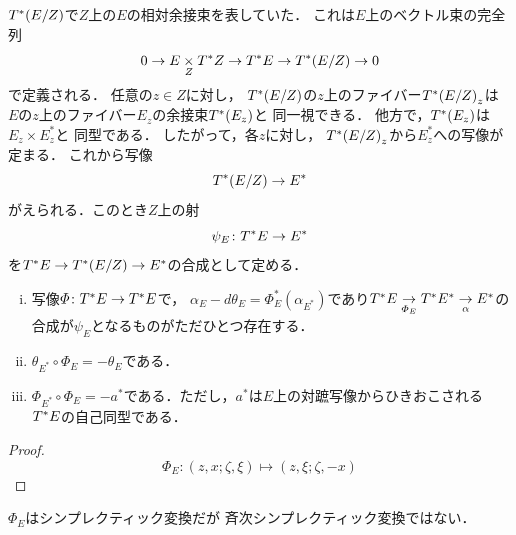 \(\cotb[(E/Z)]\)で\(Z\)上の\(E\)の相対余接束を表していた．
これは\(E\)上のベクトル束の完全列
\begin{equation}
    0\to E\pb[Z]\cotb[Z]\to\cotb[E]\to\cotb[(E/Z)]\to0
\end{equation}
で定義される．
任意の\(z\in Z\)に対し，
\(\cotb[(E/Z)]\)の\(z\)上のファイバー\(\cotb[(E/Z)]_{z}\)は
\(E\)の\(z\)上のファイバー\(E_{z}\)の余接束\(\cotb[(E_{z})]\)と
同一視できる．
他方で，\(\cotb[(E_{z})]\)は\(E_{z}\times E^{\ast}_{z}\)と
同型である．
したがって，各\(z\)に対し，
\(\cotb[(E/Z)]_{z}\)から\(E^{\ast}_{z}\)への写像が定まる．
これから写像\begin{equation}
    \cotb[(E/Z)]\to E^{\ast}
\end{equation}がえられる．このとき\(Z\)上の射
\begin{equation}
    \psi_{E}\colon\cotb[E]\to E^{\ast}
\end{equation}
を\(\cotb[E]\to \cotb[(E/Z)]\to E^{\ast}\)の合成として定める．

\begin{leftbar}
\begin{PRP}\label{prp551}
    \begin{enumerate}[(i)]
        \item 写像\(\varPhi\colon \cotb[E]\to\cotb[E]\)で，
        \(
            \alpha_{E}-d\theta_{E}
            =\varPhi_{E}^{\ast}(\alpha_{E^{\ast}})
        \)であり\(
            \cotb[E]\underset{\varPhi_{E}}{\rightarrow}
            \cotb[E^{\ast}]\underset{\alpha}{\rightarrow}
            E^{\ast}
        \)の合成が\(\psi_{E}\)となるものがただひとつ存在する．
        \item \(\theta_{E^{\ast}}\circ\varPhi_{E}=-\theta_E\)である．
        \item \(\varPhi_{E^{\ast}}\circ \varPhi_{E}=-a^{\ast}\)である．ただし，\(a^{\ast}\)は\(E\)上の対蹠写像からひきおこされる\(\cotb[E]\)の自己同型である．
    \end{enumerate}
\end{PRP}
\end{leftbar}

\begin{proof}
    \begin{equation}
        \varPhi_{E}\colon (z,x;\zeta,\xi)\mapsto(z,\xi;\zeta,-x)
    \end{equation}
\end{proof}

\begin{RMK}\label{rmk552}
    \(\varPhi_{E}\)はシンプレクティック変換だが
    斉次シンプレクティック変換ではない．
\end{RMK}

